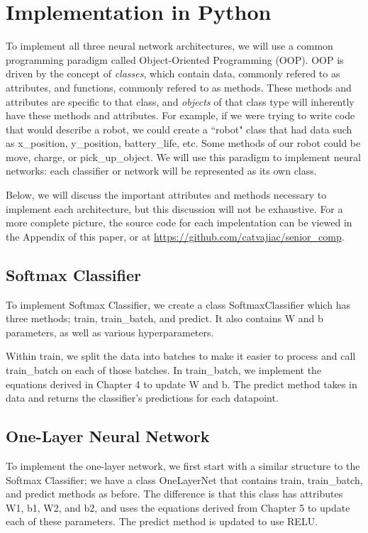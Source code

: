 \newpage
\section{Implementation in Python}\label{ch:python}

To implement all three neural network architectures, we will use a common
programming paradigm called Object-Oriented Programming (OOP). OOP is driven by
the concept of \textit{classes}, which contain data, commonly refered to as
attributes, and functions, commonly refered to as methods. These methods and
attributes are specific to that class, and \textit{objects} of that class type
will inherently have these methods and attributes. For example, if we were
trying to write code that would describe a robot, we could create a ``robot"
class that had data such as {\ttfamily x\_position}, {\ttfamily y\_position},
{\ttfamily battery\_life}, etc. Some methods of our robot could be {\ttfamily
move}, {\ttfamily charge}, or {\ttfamily pick\_up\_object}. We will use this
paradigm to implement neural networks: each classifier or network will be
represented as its own class.

Below, we will discuss the important attributes and methods necessary to
implement each architecture, but this discussion will not be exhaustive. For a
more complete picture, the source code for each impelentation can be viewed in
the Appendix of this paper, or at
\url{https://github.com/catvajiac/senior\_comp}.


\subsection{Softmax Classifier}
To implement Softmax Classifier, we create a class {\ttfamily SoftmaxClassifier}
which has three methods; {\ttfamily train}, {\ttfamily train\_batch}, and
{\ttfamily predict}. It also contains {\ttfamily W} and {\ttfamily b} parameters, as
well as various hyperparameters.

Within {\ttfamily train}, we split the data into batches to make it easier to
process and call {\ttfamily train\_batch} on each of those batches. In
{\ttfamily train\_batch}, we implement the equations derived in Chapter 4 to update
W and b. The {\ttfamily predict} method takes in data and returns the
classifier's predictions for each datapoint.

\subsection{One-Layer Neural Network}
To implement the one-layer network, we first start with a similar structure to
the Softmax Classifier; we have a class {\ttfamily OneLayerNet} that contains
{\ttfamily train}, {\ttfamily train\_batch}, and {\ttfamily predict} methods as before.
The difference is that this class has attributes {\ttfamily W1}, {\ttfamily b1},
{\ttfamily W2}, and {\ttfamily b2}, and uses the equations derived from Chapter 5 to
update each of these parameters. The {\ttfamily predict} method is updated to use
RELU.

